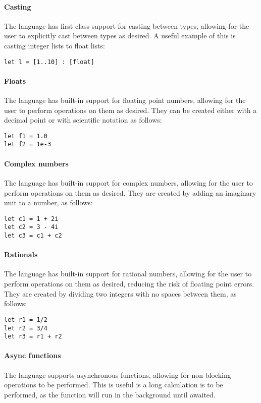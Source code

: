 \paragraph{Casting} The language has first class support for casting between types, allowing for the user to
explicitly cast between types as desired.
A useful example of this is casting integer lists to float lists:

\begin{verbatim}
let l = [1..10] : [float]
\end{verbatim}

\paragraph{Floats} The language has built-in support for floating point numbers, allowing for the user to perform
operations on them as desired.
They can be created either with a decimal point or with scientific notation as follows:

\begin{verbatim}
let f1 = 1.0
let f2 = 1e-3
\end{verbatim}

\paragraph{Complex numbers} The language has built-in support for complex numbers, allowing for the user to
perform operations on them as desired.
They are created by adding an imaginary unit to a number, as follows:

\begin{verbatim}
let c1 = 1 + 2i
let c2 = 3 - 4i
let c3 = c1 + c2
\end{verbatim}

\paragraph{Rationals} The language has built-in support for rational numbers, allowing for the user to perform
operations on them as desired, reducing the risk of floating point errors.
They are created by dividing two integers with no spaces between them, as follows:

\begin{verbatim}
let r1 = 1/2
let r2 = 3/4
let r3 = r1 + r2
\end{verbatim}



\paragraph{Async functions} The language supports asynchronous functions, allowing for non-blocking operations
to be performed.
This is useful is a long calculation is to be performed, as the function will run in the background until awaited.

